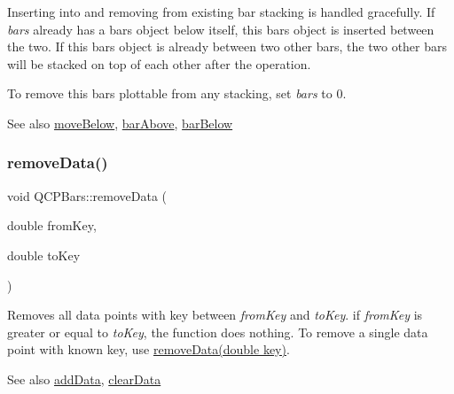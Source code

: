 Inserting into and removing from existing bar stacking is handled gracefully. If {\itshape bars} already has a bars object below itself, this bars object is inserted between the two. If this bars object is already between two other bars, the two other bars will be stacked on top of each other after the operation.

To remove this bars plottable from any stacking, set {\itshape bars} to 0.

\begin{DoxySeeAlso}{See also}
\hyperlink{class_q_c_p_bars_a69fc371346980f19177c3d1ecdad78ee}{move\+Below}, \hyperlink{class_q_c_p_bars_ab97f2acd9f6cb40d2cc3c33d278f0e78}{bar\+Above}, \hyperlink{class_q_c_p_bars_a1b58664864b141f45e02044a855b3213}{bar\+Below} 
\end{DoxySeeAlso}
\hypertarget{class_q_c_p_bars_a1fe9bcb57d670defea1bb65cadf43765}{}\label{class_q_c_p_bars_a1fe9bcb57d670defea1bb65cadf43765} 
\subsubsection{\texorpdfstring{remove\+Data()}{removeData()}\hspace{0.1cm}{\footnotesize\ttfamily [1/2]}}
{\footnotesize\ttfamily void Q\+C\+P\+Bars\+::remove\+Data (\begin{DoxyParamCaption}\item[{double}]{from\+Key,  }\item[{double}]{to\+Key }\end{DoxyParamCaption})}

Removes all data points with key between {\itshape from\+Key} and {\itshape to\+Key}. if {\itshape from\+Key} is greater or equal to {\itshape to\+Key}, the function does nothing. To remove a single data point with known key, use \hyperlink{class_q_c_p_bars_a837cc9848ad3edd40a6130b508493f93}{remove\+Data(double key)}.

\begin{DoxySeeAlso}{See also}
\hyperlink{class_q_c_p_bars_a1f29cf08615040993209147fa68de3f2}{add\+Data}, \hyperlink{class_q_c_p_bars_a11dbbd707132f07f862dff13c5789c2b}{clear\+Data} 
\end{DoxySeeAlso}
\hypertarget{class_q_c_p_bars_a837cc9848ad3edd40a6130b508493f93}{}\label{class_q_c_p_bars_a837cc9848ad3edd40a6130b508493f93} 
